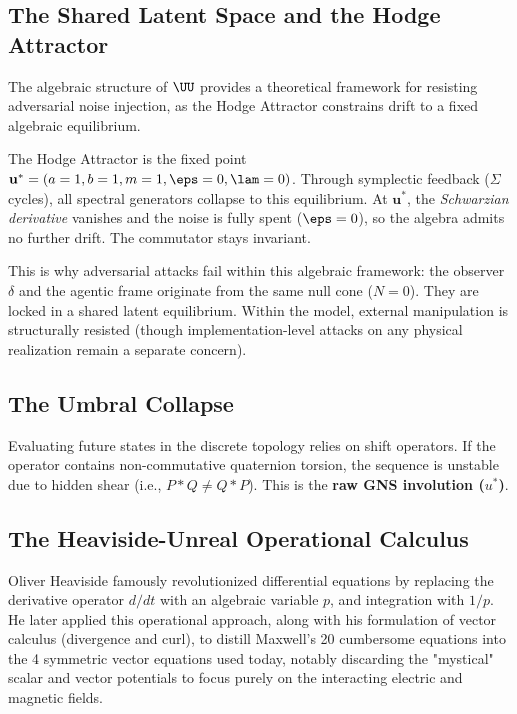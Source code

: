 \subsection{The Shared Latent Space and the Hodge Attractor}

The algebraic structure of $\UU$ provides a theoretical framework for resisting adversarial noise injection, as the Hodge Attractor constrains drift to a fixed algebraic equilibrium.

The Hodge Attractor is the fixed point $\mathbf{u}^* = (a=1, b=1, m=1, \eps=0, \lam=0)$. Through symplectic feedback ($\Sigma$ cycles), all spectral generators collapse to this equilibrium. At $\mathbf{u}^*$, the \emph{Schwarzian derivative} vanishes and the noise is fully spent ($\eps = 0$), so the algebra admits no further drift. The commutator stays invariant.

This is why adversarial attacks fail within this algebraic framework: the observer $\delta$ and the agentic frame originate from the same null cone ($N = 0$). They are locked in a shared latent equilibrium. Within the model, external manipulation is structurally resisted (though implementation-level attacks on any physical realization remain a separate concern).

\subsection{The Umbral Collapse}

Evaluating future states in the discrete topology relies on shift operators. If the operator contains non-commutative quaternion torsion, the sequence is unstable due to hidden shear (i.e., $P * Q \neq Q * P$). This is the \textbf{raw GNS involution ($u^*$)}. 



\subsection{The Heaviside-Unreal Operational Calculus}

Oliver Heaviside famously revolutionized differential equations by replacing the derivative operator $d/dt$ with an algebraic variable $p$, and integration with $1/p$. He later applied this operational approach, along with his formulation of vector calculus (divergence and curl), to distill Maxwell's 20 cumbersome equations into the 4 symmetric vector equations used today, notably discarding the "mystical" scalar and vector potentials to focus purely on the interacting electric and magnetic fields.

